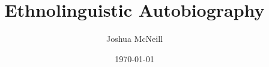 \documentclass{article}
\author{Joshua McNeill}
\title{Ethnolinguistic Autobiography}
\date{\today}
\begin{document}
  \maketitle
  \doublespacing
  
\end{document}

